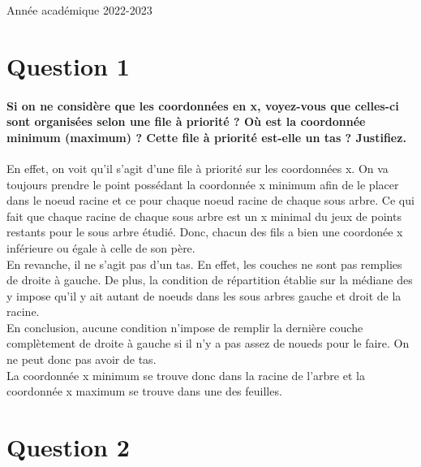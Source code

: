 \documentclass{article}
\begin{document}
\begin{titlepage}
\begin{center}
        {\large Année académique 2022-2023}
        
    \end{center}
\end{titlepage}

\tableofcontents

\newpage

\section{Question 1}
    \paragraph{Si on ne considère que les coordonnées en x, voyez-vous que celles-ci sont organisées selon
    une file à priorité ? Où est la coordonnée minimum (maximum) ? Cette file à priorité est-elle
    un tas ? Justifiez.}
    En effet, on voit qu'il s'agit d'une file à priorité sur les coordonnées x. On va toujours prendre le point possédant la coordonnée x minimum
    afin de le placer dans le noeud racine et ce pour chaque noeud racine de chaque sous arbre. Ce qui fait que chaque racine de chaque sous arbre est un x minimal du
    jeux de points restants pour le sous arbre étudié. Donc, chacun des fils a bien une coordonée x inférieure ou égale à celle de son père.\\
    En revanche, il ne s'agit pas d'un tas. En effet, les couches ne sont pas remplies de droite à gauche. De plus, la condition de répartition établie
    sur la médiane des y impose qu'il y ait autant de noeuds dans les sous arbres gauche et droit de la racine.\\ En conclusion, aucune condition
    n'impose de remplir la dernière couche complètement de droite à gauche si il n'y a pas assez de noueds pour le faire. On ne peut donc pas avoir de tas.\\
    La coordonnée x minimum se trouve donc dans la racine de l'arbre et la 
    coordonnée x maximum se trouve dans une des feuilles.

\section{Question 2}
\end{document}
